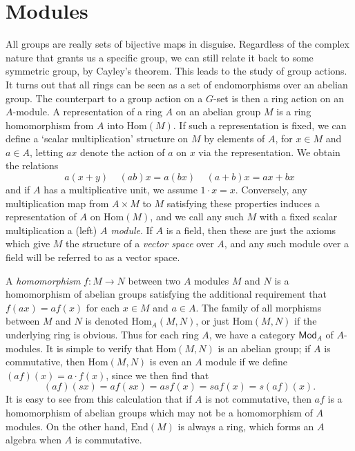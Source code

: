 \chapter{Modules}

All groups are really sets of bijective maps in disguise. Regardless of the complex nature that grants us a specific group, we can still relate it back to some symmetric group, by Cayley's theorem. This leads to the study of group actions. It turns out that all rings can be seen as a set of endomorphisms over an abelian group. The counterpart to a group action on a $G$-set is then a ring action on an $A$-module. A representation of a ring $A$ on an abelian group $M$ is a ring homomorphism from $A$ into $\text{Hom}(M)$. If such a representation is fixed, we can define a `scalar multiplication' structure on $M$ by elements of $A$, for $x \in M$ and $a \in A$, letting $ax$ denote the action of $a$ on $x$ via the representation. We obtain the relations
%
\[ a(x + y)\ \ \ \ \ (ab) x = a(bx)\ \ \ \ \ (a + b)x = ax + bx \]
%
and if $A$ has a multiplicative unit, we assume $1 \cdot x = x$. Conversely, any multiplication map from $A \times M$ to $M$ satisfying these properties induces a representation of $A$ on $\text{Hom}(M)$, and we call any such $M$ with a fixed scalar multiplication a (left) \emph{$A$ module}. If $A$ is a field, then these are just the axioms which give $M$ the structure of a \emph{vector space} over $A$, and any such module over a field will be referred to as a vector space.

A \emph{homomorphism} $f: M \to N$ between two $A$ modules $M$ and $N$ is a homomorphism of abelian groups satisfying the additional requirement that $f(ax) = af(x)$ for each $x \in M$ and $a \in A$. The family of all morphisms between $M$ and $N$ is denoted $\text{Hom}_A(M,N)$, or just $\text{Hom}(M,N)$ if the underlying ring is obvious. Thus for each ring $A$, we have a category $\mathsf{Mod}_A$ of $A$-modules. It is simple to verify that $\text{Hom}(M,N)$ is an abelian group; if $A$ is commutative, then $\text{Hom}(M,N)$ is even an $A$ module if we define $(af)(x) = a \cdot f(x)$, since we then find that
%
\[ (af)(sx) = af(sx) = as f(x) = s af(x) = s (af)(x). \]
%
It is easy to see from this calculation that if $A$ is not commutative, then $af$ is a homomorphism of abelian groups which may not be a homomorphism of $A$ modules. On the other hand, $\text{End}(M)$ is always a ring, which forms an $A$ algebra when $A$ is commutative.

